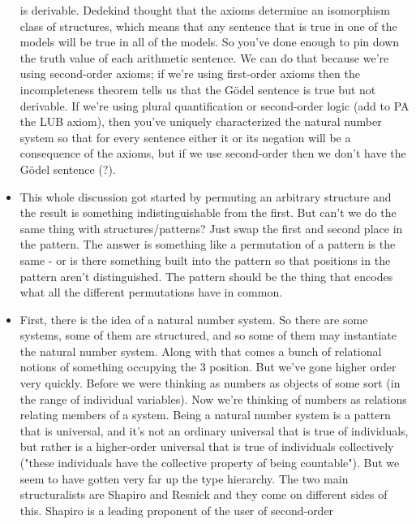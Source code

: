 \documentclass[12pt]{article}
\theoremstyle{definition}
\begin{document}
\begin{itemize}
        is derivable. Dedekind thought that the axioms determine an isomorphism
        class of structures, which means that any sentence that is true in one
        of the models will be true in all of the models. So you've done enough
        to pin down the truth value of each arithmetic sentence. We can do that
        because we're using second-order axioms; if we're using first-order
        axioms then the incompleteness theorem tells us that the G\"odel
        sentence is true but not derivable. If we're using plural
        quantification or second-order logic (add to PA the LUB axiom), then
        you've uniquely characterized the natural number system so that for
        every sentence either it or its negation will be a consequence of the
        axioms, but if we use second-order then we don't have the G\"odel
        sentence (?).
    \item
        This whole discussion got started by permuting an arbitrary structure
        and the result is something indistinguishable from the first. But can't
        we do the same thing with structures/patterns? Just swap the first and
        second place in the pattern. The answer is something like a permutation
        of a pattern is the same - or is there something built into the pattern
        so that positions in the pattern aren't distinguished. The pattern
        should be the thing that encodes what all the different permutations
        have in common. 
    \item
        First, there is the idea of a natural number system. So there are some
        systems, some of them are structured, and so some of them may
        instantiate the natural number system. Along with that comes a bunch of
        relational notions of something occupying the 3 position. But we've
        gone higher order very quickly. Before we were thinking as numbers as
        objects of some sort (in the range of individual variables). Now we're
        thinking of numbers as relations relating members of a system. Being a
        natural number system is a pattern that is universal, and it's not an
        ordinary universal that is true of individuals, but rather is a
        higher-order universal that is true of individuals collectively ("these
        individuals have the collective property of being countable"). But we
        seem to have gotten very far up the type hierarchy. The two main
        structuralists are Shapiro and Resnick and they come on different sides
        of this. Shapiro is a leading proponent of the user of second-order

\end{itemize}
\end{document}
